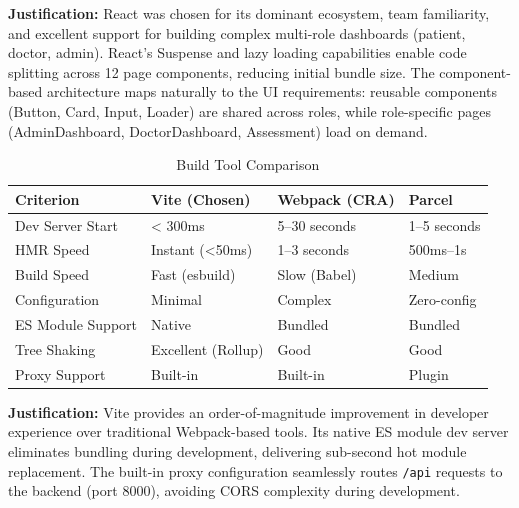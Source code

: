 \documentclass[12pt]{article}
\begin{document}
	\textbf{Justification:} React was chosen for its dominant ecosystem, team familiarity, and excellent support for building complex multi-role dashboards (patient, doctor, admin). React's Suspense and lazy loading capabilities enable code splitting across 12 page components, reducing initial bundle size. The component-based architecture maps naturally to the UI requirements: reusable components (Button, Card, Input, Loader) are shared across roles, while role-specific pages (AdminDashboard, DoctorDashboard, Assessment) load on demand.

	\begin{table}[H]
		\centering
		\caption{Build Tool Comparison}
		\small
		\begin{tabular}{|p{2.5cm}|p{2.5cm}|p{2.5cm}|p{2.5cm}|}
			\hline
			\textbf{Criterion} & \textbf{Vite (Chosen)} & \textbf{Webpack (CRA)} & \textbf{Parcel} \\ \hline
			Dev Server Start & < 300ms & 5--30 seconds & 1--5 seconds \\ \hline
			HMR Speed & Instant (<50ms) & 1--3 seconds & 500ms--1s \\ \hline
			Build Speed & Fast (esbuild) & Slow (Babel) & Medium \\ \hline
			Configuration & Minimal & Complex & Zero-config \\ \hline
			ES Module Support & Native & Bundled & Bundled \\ \hline
			Tree Shaking & Excellent (Rollup) & Good & Good \\ \hline
			Proxy Support & Built-in & Built-in & Plugin \\ \hline
		\end{tabular}
	\end{table}

	\textbf{Justification:} Vite provides an order-of-magnitude improvement in developer experience over traditional Webpack-based tools. Its native ES module dev server eliminates bundling during development, delivering sub-second hot module replacement. The built-in proxy configuration seamlessly routes \texttt{/api} requests to the backend (port 8000), avoiding CORS complexity during development.
\end{document}
